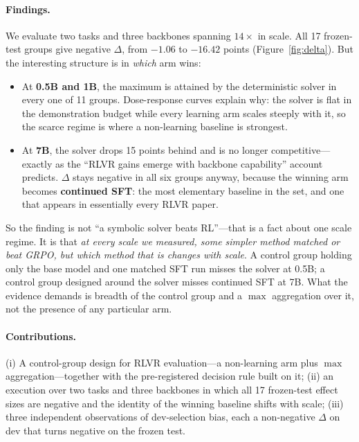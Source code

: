 \paragraph{Findings.}
We evaluate two tasks and three backbones spanning $14\times$ in scale. All 17
frozen-test groups give negative $\Delta$, from $-1.06$ to $-16.42$ points
(Figure~\ref{fig:delta}). But the interesting structure is in \emph{which} arm
wins:

\begin{itemize}\itemsep2pt
\item At \textbf{0.5B and 1B}, the maximum is attained by the deterministic
solver in every one of 11 groups. Dose-response curves explain why: the solver
is flat in the demonstration budget while every learning arm scales steeply
with it, so the scarce regime is where a non-learning baseline is strongest.
\item At \textbf{7B}, the solver drops 15 points behind and is no longer
competitive---exactly as the ``RLVR gains emerge with backbone capability''
account predicts. $\Delta$ stays negative in all six groups anyway, because the
winning arm becomes \textbf{continued SFT}: the most elementary baseline in the
set, and one that appears in essentially every RLVR paper.
\end{itemize}

So the finding is not ``a symbolic solver beats RL''---that is a fact about one
scale regime. It is that \emph{at every scale we measured, some simpler method
matched or beat GRPO, but which method that is changes with scale}. A control
group holding only the base model and one matched SFT run misses the solver at
0.5B; a control group designed around the solver misses continued SFT at 7B.
What the evidence demands is breadth of the control group and a $\max$
aggregation over it, not the presence of any particular arm.

\paragraph{Contributions.}
(i) A control-group design for RLVR evaluation---a non-learning arm plus $\max$
aggregation---together with the pre-registered decision rule built on it;
(ii) an execution over two tasks and three backbones in which all 17
frozen-test effect sizes are negative and the identity of the winning baseline
shifts with scale; (iii) three independent observations of dev-selection bias,
each a non-negative $\Delta$ on dev that turns negative on the frozen test.

